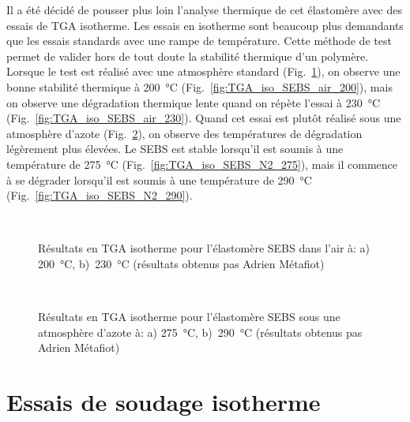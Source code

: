 Il a été décidé de pousser plus loin l'analyse thermique de cet élastomère avec des essais de TGA isotherme. 
Les essais en isotherme sont beaucoup plus demandants que les essais standards avec une rampe de température. 
Cette méthode de test permet de valider hors de tout doute la stabilité thermique d'un polymère. 
Lorsque le test est réalisé avec une atmosphère standard (Fig.~\ref{fig:TGA_iso_SEBS_air}), on observe une bonne stabilité thermique à \SI[locale=FR]{200}{\celsius} (Fig.~\ref{fig:TGA_iso_SEBS_air_200}), mais on observe une dégradation thermique lente quand on répète l'essai à \SI[locale=FR]{230}{\celsius} (Fig.~\ref{fig:TGA_iso_SEBS_air_230}). 
Quand cet essai est plutôt réalisé sous une atmosphère d'azote (Fig.~\ref{fig:TGA_iso_SEBS_N2}), on observe des températures de dégradation légèrement plus élevées. 
Le SEBS est stable lorsqu'il est soumis à une température de \SI[locale=FR]{275}{\celsius} (Fig.~\ref{fig:TGA_iso_SEBS_N2_275}), mais il commence à se dégrader lorsqu'il est soumis à une température de \SI[locale=FR]{290}{\celsius} (Fig.~\ref{fig:TGA_iso_SEBS_N2_290}). 

\begin{figure}[h]
	\centering
	\\
	\caption{Résultats en TGA isotherme pour l'élastomère SEBS dans l'air à: a) \SI{200}{\celsius}, b)~\SI{230}{\celsius} (résultats obtenus pas Adrien Métafiot)}
	\label{fig:TGA_iso_SEBS_air}
\end{figure}

\begin{figure}[h]
	\centering
	\\
	\caption{Résultats en TGA isotherme pour l'élastomère SEBS sous une atmosphère d'azote à: a) \SI{275}{\celsius}, b)~\SI{290}{\celsius} (résultats obtenus pas Adrien Métafiot)}
	\label{fig:TGA_iso_SEBS_N2}
\end{figure}

\section{Essais de soudage isotherme}

